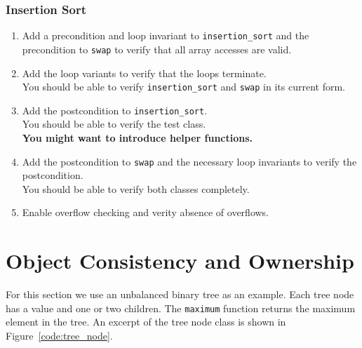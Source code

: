 \documentclass[a4paper,12pt]{article}
\newcommand{\e}[1]{\mbox{\lstinline[language=Eiffel]|#1|}}
\begin{document}
\subsubsection*{Insertion Sort}

\begin{enumerate}[label=\bfseries Task \arabic*:, leftmargin=1.8cm]
\item Add a precondition and loop invariant to \e{insertion_sort} and the precondition to \e{swap} to verify that all array accesses are valid.
\item Add the loop variants to verify that the loops terminate. \\
      You should be able to verify \e{insertion_sort} and \e{swap} in its current form.
\item Add the postcondition to \e{insertion_sort}. \\
      You should be able to verify the test class. \\
      \textbf{You might want to introduce helper functions.}
\item Add the postcondition to \e{swap} and the necessary loop invariants to verify the postcondition. \\
      You should be able to verify both classes completely.
\item Enable overflow checking and verity absence of overflows.
\end{enumerate}


\newpage
\section{Object Consistency and Ownership} \label{sec:ownership}

For this section we use an unbalanced binary tree as an example. Each tree node has a value and one or two children. The \e{maximum} function returns the maximum element in the tree. An excerpt of the tree node class is shown in Figure~\ref{code:tree_node}.
\end{document}
